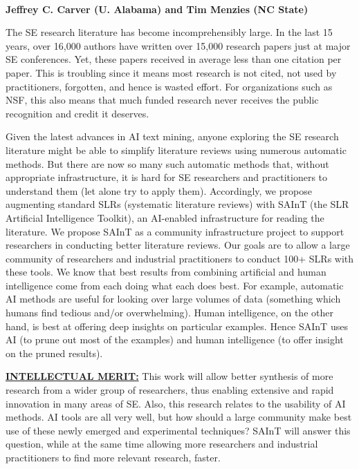\begin{center}
{\bf \TITLE\\
Jeffrey C. Carver (U. Alabama) and Tim Menzies (NC State)}
 \end{center}
 
The SE research literature has become incomprehensibly large. In the last 15 years, over 16,000 authors have written over 15,000 research papers just at major SE conferences. Yet, these papers received in average less than one citation per paper. This is troubling since it means most research is not cited, not used by practitioners, forgotten, and hence is wasted effort. For organizations such as NSF, this also means that much funded research never receives the public recognition and credit it deserves.

Given the latest advances in AI text mining, anyone exploring the SE research  literature might be able to simplify literature reviews using numerous automatic methods. But there are now so many such automatic methods that, without appropriate infrastructure, it is hard for SE researchers and practitioners to understand them (let alone try to apply them). Accordingly, we propose augmenting standard SLRs (systematic literature reviews) with SAInT (the SLR Artificial Intelligence Toolkit), an AI-enabled infrastructure for reading the literature. We propose SAInT as a community infrastructure project to support researchers in conducting better literature reviews. Our goals are to allow a large community of researchers and industrial practitioners to conduct 100+ SLRs   with these tools. We know that best results from combining artificial and human intelligence come from  each doing what each does best. For example, automatic AI methods are useful for looking over large volumes of data (something which humans find tedious and/or overwhelming). Human intelligence, on the other hand, is best at offering deep insights on particular examples. Hence SAInT uses  AI  (to prune out most of the examples) and human intelligence (to offer insight on the pruned results).


 
 \noindent
\underline{{\bf INTELLECTUAL MERIT:}}
This work will allow better synthesis  of more research from a wider group of researchers, thus enabling extensive and rapid innovation in many areas of SE.
Also, this research relates to the usability of AI methods. AI tools are all very well, but how should a large community make best use of these newly emerged and experimental techniques? SAInT will answer this question, while at the same time allowing more researchers and industrial practitioners to find more relevant research, faster. 

